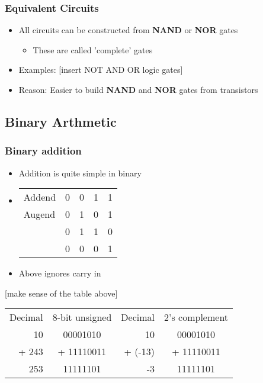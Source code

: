 \documentclass{article}
\begin{document}
\subsubsection{Equivalent Circuits}
\begin{itemize}
\item All circuits can be constructed from \textbf{NAND} or \textbf{NOR} gates
\begin{itemize}
\item These are called 'complete' gates
\end{itemize}

\item{Examples:}
[insert NOT AND OR logic gates]

\item Reason: Easier to build \textbf{NAND} and \textbf{NOR} gates from transistors
\end{itemize}

\subsection{Binary Arthmetic}

\subsubsection{Binary addition}

\begin{itemize}
\item{Addition is quite simple in binary}
\item
\begin{tabular} { l | c c c c}
Addend & 0 & 0 & 1 & 1 \\
Augend & 0 & 1 & 0 & 1 \\
 & 0 & 1 & 1 & 0 \\
 & 0 & 0 & 0 & 1 
\end{tabular}
\item Above ignores carry in
\end{itemize}
[make sense of the table above]

\begin{tabular} { r | c | r | c }
Decimal & 8-bit unsigned & Decimal & 2's complement \\
10 & 00001010 & 10 & 00001010 \\
+ 243 & + 11110011 & + (-13) & + 11110011 \\
\hline
253 & 11111101 & -3 & 11111101 \\
\end{tabular}
\end{document}

